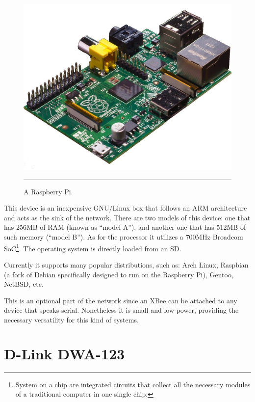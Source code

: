 \begin{figure}[htbp]
    \centering
    \includegraphics[scale=0.2]{./Figures/pi.jpg}
        \rule{35em}{0.5pt}
        \caption[Raspberry Pi]{A Raspberry Pi.}
    \label{fig:RaspberryPi}
\end{figure}

This device is an inexpensive GNU/Linux box that follows an ARM architecture and acts as the sink of the network. There are two models of this device: one that has 256MB of RAM (known as ``model A''), and another one that has 512MB of such memory (``model B''). As for the processor it utilizes a 700MHz Broadcom SoC\footnote{System on a chip are integrated circuits that collect all the necessary modules of a traditional computer in one single chip.}. The operating system is directly loaded from an SD.

Currently it supports many popular distributions, such as: Arch Linux, Raspbian (a fork of Debian specifically designed to run on the Raspberry Pi), Gentoo, NetBSD, etc.

This is an optional part of the network since an XBee can be attached to any device that speaks serial. Nonetheless it is small and low-power, providing the necessary versatility for this kind of systems.

\section{D-Link DWA-123}

